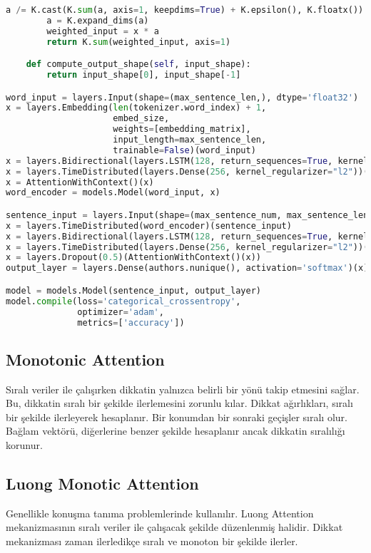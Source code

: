 \begin{lstlisting}[language=Python]
        a /= K.cast(K.sum(a, axis=1, keepdims=True) + K.epsilon(), K.floatx())
        a = K.expand_dims(a)
        weighted_input = x * a
        return K.sum(weighted_input, axis=1)

    def compute_output_shape(self, input_shape):
        return input_shape[0], input_shape[-1]

word_input = layers.Input(shape=(max_sentence_len,), dtype='float32')
x = layers.Embedding(len(tokenizer.word_index) + 1, 
                     embed_size, 
                     weights=[embedding_matrix], 
                     input_length=max_sentence_len, 
                     trainable=False)(word_input)
x = layers.Bidirectional(layers.LSTM(128, return_sequences=True, kernel_regularizer="l2"))(x)
x = layers.TimeDistributed(layers.Dense(256, kernel_regularizer="l2"))(x)
x = AttentionWithContext()(x)
word_encoder = models.Model(word_input, x)

sentence_input = layers.Input(shape=(max_sentence_num, max_sentence_len), dtype='float32')
x = layers.TimeDistributed(word_encoder)(sentence_input)
x = layers.Bidirectional(layers.LSTM(128, return_sequences=True, kernel_regularizer="l2"))(x)
x = layers.TimeDistributed(layers.Dense(256, kernel_regularizer="l2"))(x)
x = layers.Dropout(0.5)(AttentionWithContext()(x))
output_layer = layers.Dense(authors.nunique(), activation='softmax')(x)

model = models.Model(sentence_input, output_layer)
model.compile(loss='categorical_crossentropy', 
              optimizer='adam', 
              metrics=['accuracy'])
\end{lstlisting}

\newpage

\subsection{Monotonic Attention}
Sıralı veriler ile çalışırken dikkatin yalnızca belirli bir yönü takip etmesini sağlar. Bu, dikkatin sıralı bir şekilde ilerlemesini zorunlu kılar. Dikkat ağırlıkları, sıralı bir şekilde ilerleyerek hesaplanır. Bir konumdan bir sonraki geçişler sıralı olur. Bağlam vektörü, diğerlerine benzer şekilde hesaplanır ancak dikkatin sıralılığı korunur.

\newpage

\subsection{Luong Monotic Attention}
Genellikle konuşma tanıma problemlerinde kullanılır. Luong Attention mekanizmasının sıralı veriler ile çalışacak şekilde düzenlenmiş halidir. Dikkat mekanizması zaman ilerledikçe sıralı ve monoton bir şekilde ilerler.

